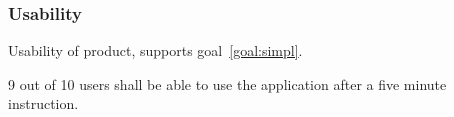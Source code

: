 \documentclass[10pt,a4paper]{article}
\begin{document}
\subsubsection{Usability}
Usability of product, supports goal~\ref{goal:simpl}.
\begin{description}
	\item [Req \thesubsubsection {.\theusab} User friendly] 9 out of 10 users shall be able to use the application after a five minute instruction.
\end{description}









\end{document}
